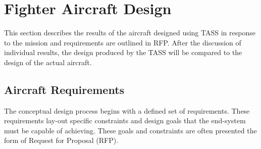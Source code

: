 \documentclass[pdftex,11pt,letter]{article}
\begin{document}

\section{Fighter Aircraft Design}
This section describes the results of the aircraft designed using TASS in response to the mission and requirements are outlined in RFP\cite{MavrisNotes}. After the discussion of individual results, the design produced by the TASS will be compared to the design of the actual aircraft.

\subsection{Aircraft Requirements}\label{requirements}
 The conceptual design process begins with a defined set of requirements. These requirements lay-out specific constraints and design goals that the end-system must be capable of achieving.  These goals and constraints are often presented the form of Request for Proposal (RFP). %
\end{document}
